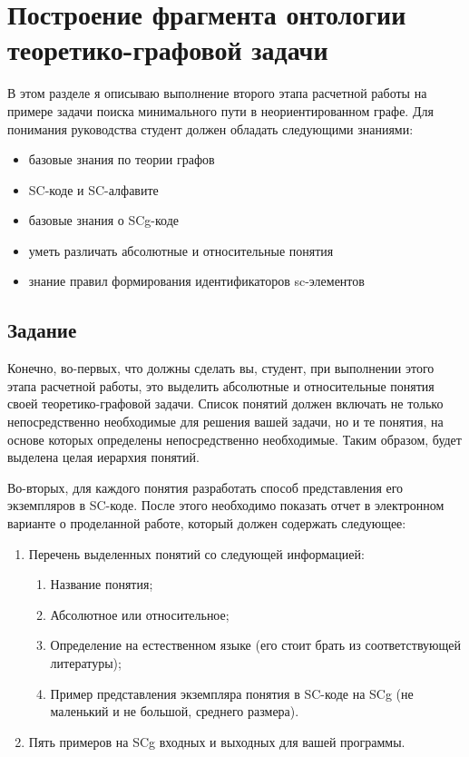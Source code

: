 \chapter{Построение фрагмента онтологии теоретико-графовой задачи}

В этом разделе я описываю выполнение второго этапа расчетной
работы на примере задачи поиска минимального пути в неориентированном
графе. Для понимания руководства студент должен обладать следующими
знаниями: 

\begin{itemize}
\item базовые знания по теории графов
\item SC-коде и SC-алфавите
\item базовые знания о SCg-коде
\item уметь различать абсолютные и относительные понятия
\item знание правил формирования идентификаторов sc-элементов
\end{itemize}

\section{Задание}

Конечно, во-первых, что должны сделать вы, студент, при выполнении
этого этапа расчетной работы, это выделить абсолютные и относительные
понятия своей теоретико-графовой задачи. Список понятий должен
включать не только непосредственно необходимые для решения вашей
задачи, но и те понятия, на основе которых определены непосредственно
необходимые. Таким образом, будет выделена целая иерархия понятий.

Во-вторых, для каждого понятия разработать способ представления его
экземпляров в SC-коде. После этого необходимо показать отчет в
электронном варианте о проделанной работе, который должен содержать
следующее:

\begin{enumerate}
\item Перечень выделенных понятий со следующей информацией:
  \begin{enumerate}
  \item Название понятия;
  \item Абсолютное или относительное;
  \item Определение на естественном языке (его стоит брать из соответствующей
    литературы);
  \item Пример представления экземпляра понятия в SC-коде на
    SCg (не маленький и не большой, среднего размера). 
  \end{enumerate}
\item Пять примеров на SCg входных и выходных для вашей программы. 
\end{enumerate}

